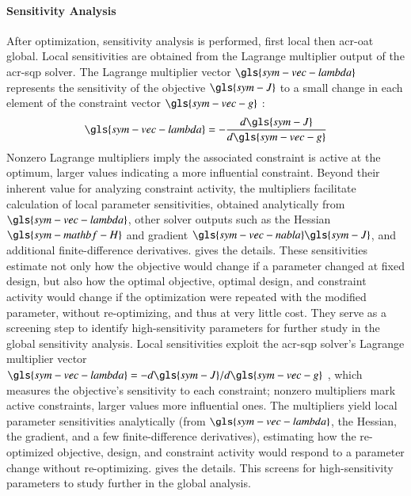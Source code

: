 \paragraph{Sensitivity Analysis}
After optimization, sensitivity analysis is performed, first local then \gls{acr-oat} global.
\ifdefined\DISSERTATION
    Local sensitivities are obtained from the Lagrange multiplier output of the \gls{acr-sqp} solver.
    The Lagrange multiplier vector $\gls{sym-vec-lambda}$ represents the sensitivity of the objective $\gls{sym-J}$ to a small change in each element of the constraint vector $\gls{sym-vec-g}$ \citep{martins_engineering_2022}:
    \begin{equation}
        \gls{sym-vec-lambda} = -\frac{d\gls{sym-J}}{d\gls{sym-vec-g}} %
    \end{equation}
    Nonzero Lagrange multipliers imply the associated constraint is active at the optimum, larger values indicating a more influential constraint.
    Beyond their inherent value for analyzing constraint activity, the multipliers facilitate calculation of local parameter sensitivities, obtained analytically from $\gls{sym-vec-lambda}$, other solver outputs such as the Hessian $\gls{sym-mathbf-H}$ and gradient $\gls{sym-vec-nabla}\gls{sym-J}$, and additional finite-difference derivatives.
     gives the details.
    These sensitivities estimate not only how the objective would change if a parameter changed at fixed design, but also how the optimal objective, optimal design, and constraint activity would change if the optimization were repeated with the modified parameter, without re-optimizing, and thus at very little cost.
    They serve as a screening step to identify high-sensitivity parameters for further study in the global sensitivity analysis.
\else
    Local sensitivities exploit the \gls{acr-sqp} solver's Lagrange multiplier vector $\gls{sym-vec-lambda} = -d\gls{sym-J}/d\gls{sym-vec-g}$ \citep{martins_engineering_2022}, which measures the objective's sensitivity to each constraint; nonzero multipliers mark active constraints, larger values more influential ones.
    The multipliers yield local parameter sensitivities analytically (from $\gls{sym-vec-lambda}$, the Hessian, the gradient, and a few finite-difference derivatives), estimating how the re-optimized objective, design, and constraint activity would respond to a parameter change without re-optimizing.
     gives the details.
    This screens for high-sensitivity parameters to study further in the global analysis.
\fi

